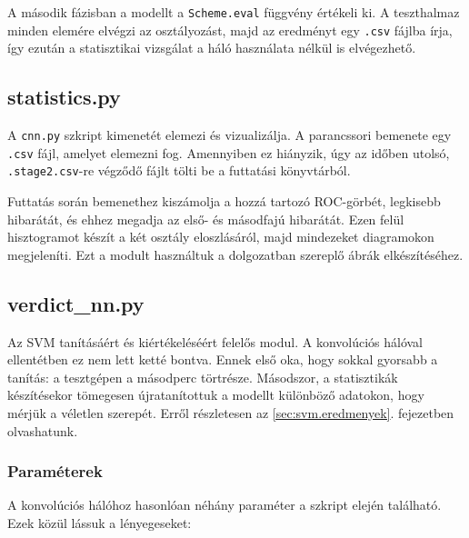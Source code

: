 A második fázisban a modellt a \texttt{Scheme.eval} függvény értékeli ki. A teszthalmaz 
minden elemére elvégzi az osztályozást, majd az eredményt egy \texttt{.csv} fájlba írja, így ezután a statisztikai vizsgálat a háló használata nélkül is elvégezhető.



\subsection{statistics.py}

A \texttt{cnn.py} szkript kimenetét elemezi és vizualizálja. 
A parancssori bemenete egy \texttt{.csv} fájl, amelyet elemezni fog. Amennyiben ez hiányzik, úgy az időben utolsó, \texttt{.stage2.csv}-re végződő fájlt tölti be a futtatási könyvtárból.


Futtatás során bemenethez kiszámolja a hozzá tartozó ROC-görbét, legkisebb hibarátát,
és ehhez megadja az első- és másodfajú hibarátát. Ezen felül hisztogramot készít a 
két osztály eloszlásáról, majd mindezeket diagramokon megjeleníti. Ezt a modult használtuk
a dolgozatban szereplő ábrák elkészítéséhez.


\subsection{verdict\_nn.py}

Az SVM tanításáért és kiértékeléséért felelős modul. A konvolúciós hálóval ellentétben
ez nem lett ketté bontva. Ennek első oka, hogy sokkal gyorsabb a tanítás: a tesztgépen 
a másodperc törtrésze. Másodszor, a statisztikák készítésekor tömegesen újratanítottuk a 
modellt különböző adatokon, hogy mérjük a véletlen szerepét. Erről részletesen 
az \ref{sec:svm.eredmenyek}. fejezetben olvashatunk.

\subsubsection{Paraméterek}

A konvolúciós hálóhoz hasonlóan néhány paraméter a szkript elején található. Ezek közül
lássuk a lényegeseket:


